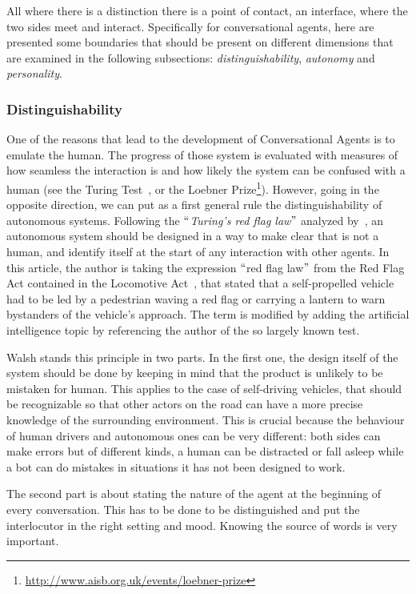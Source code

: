 All where there is a distinction there is a point of contact, an interface, where the two sides meet and interact. Specifically for conversational agents, here are presented some boundaries that should be present on different dimensions that are examined in the following subsections: \textit{distinguishability}, \textit{autonomy} and \textit{personality}.

\subsubsection{Distinguishability}
One of the reasons that lead to the development of Conversational Agents is to emulate the human. The progress of those system is evaluated with measures of how seamless the interaction is and how likely the system can be confused with a human (see the Turing Test~\cite{turing1950computing}, or the Loebner Prize\footnote{\url{http://www.aisb.org.uk/events/loebner-prize}}). However, going in the opposite direction, we can put as a first general rule the distinguishability of autonomous systems. Following the $``$\textit{Turing's red flag law}$"$  analyzed by~\cite{walsh2016turing}, an autonomous system should be designed in a way to make clear that is not a human, and identify itself at the start of any interaction with other agents. In this article, the author is taking the expression $``$red flag law$"$  from the Red Flag Act contained in the Locomotive Act~\cite{rickards1817statutes}, that stated that a self-propelled vehicle had to be led by a pedestrian waving a red flag or carrying a lantern to warn bystanders of the vehicle's approach. The term is modified by adding the artificial intelligence topic by referencing the author of the so largely known test.

Walsh stands this principle in two parts. In the first one, the design itself of the system should be done by keeping in mind that the product is unlikely to be mistaken for human. This applies to the case of self-driving vehicles, that should be recognizable so that other actors on the road can have a more precise knowledge of the surrounding environment. This is crucial because the behaviour of human drivers and autonomous ones can be very different: both sides can make errors but of different kinds, a human can be distracted or fall asleep while a bot can do mistakes in situations it has not been designed to work.

The second part is about stating the nature of the agent at the beginning of every conversation. This has to be done to be distinguished and put the interlocutor in the right setting and mood. Knowing the source of words is very important.

